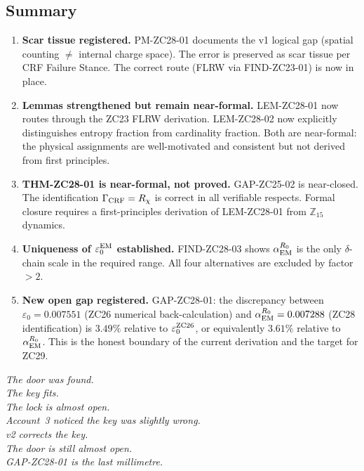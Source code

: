 \documentclass[12pt, a4paper]{article}
\begin{document}
\subsection{Summary}
\label{zc28:sec:summary}

\begin{enumerate}[leftmargin=*]

\item \textbf{Scar tissue registered.}
PM-ZC28-01 documents the v1 logical gap (spatial counting
$\neq$ internal charge space). The error is preserved
as scar tissue per CRF Failure Stance.
The correct route (FLRW via FIND-ZC23-01) is now in place.

\item \textbf{Lemmas strengthened but remain near-formal.}
LEM-ZC28-01 now routes through the ZC23 FLRW derivation.
LEM-ZC28-02 now explicitly distinguishes entropy fraction
from cardinality fraction. Both are near-formal: the physical
assignments are well-motivated and consistent but not
derived from first principles.

\item \textbf{THM-ZC28-01 is near-formal, not proved.}
GAP-ZC25-02 is near-closed. The identification
$\Gamma_{\rm CRF} = R_\chi$ is correct in all verifiable
respects. Formal closure requires a first-principles derivation
of LEM-ZC28-01 from $\mathbb{Z}_{15}$ dynamics.

\item \textbf{Uniqueness of $\varepsilon_0^{\rm EM}$ established.}
FIND-ZC28-03 shows $\alpha_{\rm EM}^{R_0}$ is the only
$\delta$-chain scale in the required range. All four alternatives
are excluded by factor $> 2$.

\item \textbf{New open gap registered.}
GAP-ZC28-01: the discrepancy between $\varepsilon_0 = 0.007551$
(ZC26 numerical back-calculation) and
$\alpha_{\rm EM}^{R_0} = 0.007288$ (ZC28 identification)
is $3.49\%$ relative to $\varepsilon_0^{\rm ZC26}$,
or equivalently $3.61\%$ relative to $\alpha_{\rm EM}^{R_0}$.
This is the honest boundary of the current derivation
and the target for ZC29.

\end{enumerate}

\bigskip
\begin{center}
\textit{%
  The door was found.\\
  The key fits.\\
  The lock is almost open.\\[0.5em]
  Account~3 noticed the key was slightly wrong.\\
  v2 corrects the key.\\
  The door is still almost open.\\[0.5em]
  GAP-ZC28-01 is the last millimetre.%
}
\end{center}
\end{document}
